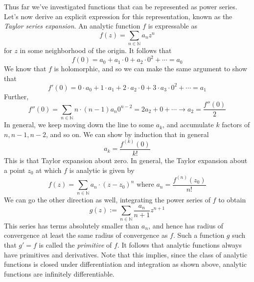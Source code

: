 \documentclass{article}
\newcommand*{\ti}{\textit}
\newcommand*{\nn}{\newline \newline}
\newcommand*{\N}{\mathbb{N}}
\begin{document}
\qedsymbol
\nn
Thus far we've investigated functions that can be represented as power series. Let's now derive an explicit expression for this representation, known as the \ti{Taylor series expansion}. An analytic function $ f $ is expressable as 
    $$ f(z) = \sum_{n \in \N} a_n z^n $$
for $ z $ in some neighborhood of the origin. It follows that
    $$ f(0) = a_0 + a_1 \cdot 0 + a_2 \cdot 0^2 + \cdots = a_0 $$
We know that $ f $ is holomorphic, and so we can make the same argument to show that
    $$ f'(0) = 0 \cdot a_0 + 1 \cdot a_1 + 2 \cdot a_2 \cdot 0 + 3 \cdot a_3 \cdot 0^2 + \cdots = a_1 $$
Further,
    $$ f''(0) = \sum_{n \in \N} n \cdot (n - 1) a_n 0^{n - 2} = 2 a_2 + 0 + \cdots \rightarrow a_2 = \frac{f''(0)}{2} $$
In general, we keep moving down the line to some $ a_k $, and accumulate $ k $ factors of $ n, n - 1, n - 2 $, and so on. We can show by induction that in general
    $$ a_k = \frac{f^{(k)}(0)}{k!} $$
This is that Taylor expansion about zero. In general, the Taylor expansion about a point $ z_0 $ at which $ f $ is analytic is given by
    $$ f(z) = \sum_{n \in \N} a_n \cdot (z - z_0)^n \text{ where } a_n = \frac{f^{(n)}(z_0)}{n!} $$
We can go the other direction as well, integrating the power series of $ f $ to obtain
    $$ g(z) := \sum_{n \in \N} \frac{a_n}{n + 1} z^{n + 1} $$
This series has terms absolutely smaller than $ a_n $, and hence has radius of convergence at least the same radius of convergence as $ f $. Such a function $ g $ such that $ g' = f $ is called the \ti{primitive} of $ f $. It follows that analytic functions always have primitives and derivatives. Note that this implies, since the class of analytic functions is closed under differentiation and integration as shown above, analytic functions are infinitely differentiable.
\end{document}
